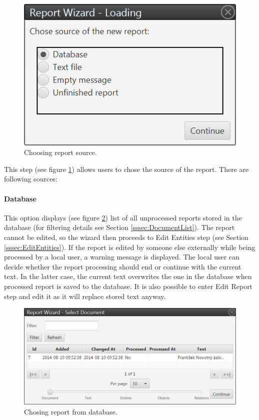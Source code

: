 \begin{figure}[!htb]
        \centering
        \includegraphics{Images/source}
        \caption{Choosing report source.}
        \label{fig:Source}
\end{figure}

This step (see figure \ref{fig:Source}) allows users to chose the source of the
report. There are following sources:

\paragraph{Database} This option displays (see figure \ref{fig:Database}) list
of all unprocessed reports stored in the database (for filtering details see
Section \ref{sssec:DocumentList}).
The report cannot be edited, so the wizard then proceeds to Edit Entities step
(see Section \ref{sssec:EditEntities}).  If the report is edited by someone else
externally while being processed by a local user, a warning message is
displayed. The local user can decide whether the report processing should end or
continue with the current text. In the latter case, the current text overwrites
the one in the database when processed report is saved to the database. It is
also possible to enter Edit Report step and edit it as it will replace stored
text anyway.

\begin{figure}[!htb]
        \centering
        \includegraphics[width=\textwidth]{Images/database}
        \caption{Chosing report from database.}
        \label{fig:Database}
\end{figure}

